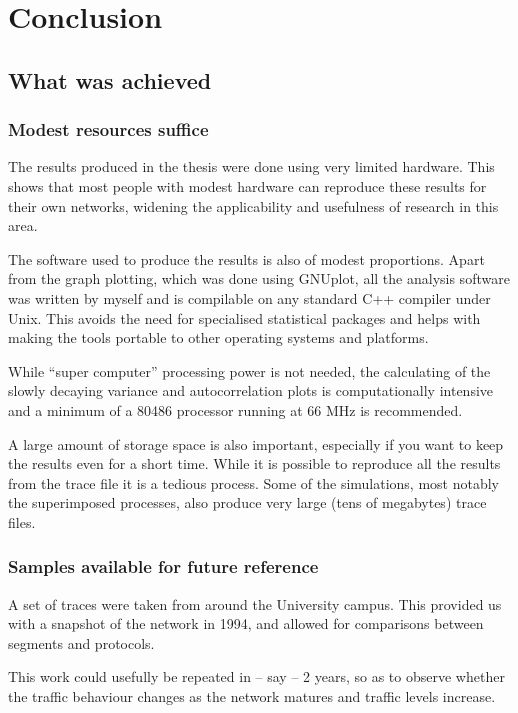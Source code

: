 \chapter{Conclusion}
\label{conclusion}

\section{What was achieved}

\subsection{Modest resources suffice}

The results produced in the thesis were done using very limited
hardware.  This shows that most people with modest hardware can
reproduce these results for their own networks, widening the
applicability and usefulness of research in this area.

The software used to produce the results is also of modest
proportions.  Apart from the graph plotting, which was done using
GNUplot, all the analysis software was written by myself and is
compilable on any standard C++ compiler under Unix.  This avoids the
need for specialised statistical packages and helps with making the
tools portable to other operating systems and platforms.

While ``super computer'' processing power is not needed, the
calculating of the slowly decaying variance and autocorrelation plots
is computationally intensive and a minimum of a 80486 processor
running at 66 MHz is recommended.

A large amount of storage space is also important, especially if you
want to keep the results even for a short time.  While it is possible
to reproduce all the results from the trace file it is a tedious
process.  Some of the simulations, most notably the superimposed
processes, also produce very large (tens of megabytes) trace files.

\subsection{Samples available for future reference}

A set of traces were taken from around the University campus.  This
provided us with a snapshot of the network in 1994, and allowed for
comparisons between segments and protocols.

This work could usefully be repeated in -- say -- 2 years, so as to
observe whether the traffic behaviour changes as the network matures
and traffic levels increase.

